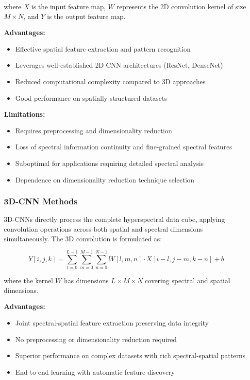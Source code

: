 \documentclass[journal]{IEEEtran}
\begin{document}
where $X$ is the input feature map, $W$ represents the 2D convolution kernel of size $M \times N$, and $Y$ is the output feature map.

\textbf{Advantages:}
\begin{itemize}
\item Effective spatial feature extraction and pattern recognition
\item Leverages well-established 2D CNN architectures (ResNet, DenseNet)
\item Reduced computational complexity compared to 3D approaches
\item Good performance on spatially structured datasets
\end{itemize}

\textbf{Limitations:}
\begin{itemize}
\item Requires preprocessing and dimensionality reduction
\item Loss of spectral information continuity and fine-grained spectral features
\item Suboptimal for applications requiring detailed spectral analysis
\item Dependence on dimensionality reduction technique selection
\end{itemize}

\subsubsection{3D-CNN Methods}

3D-CNNs directly process the complete hyperspectral data cube, applying convolution operations across both spatial and spectral dimensions simultaneously. The 3D convolution is formulated as:

\begin{equation}
Y[i,j,k] = \sum_{l=0}^{L-1} \sum_{m=0}^{M-1} \sum_{n=0}^{N-1} W[l,m,n] \cdot X[i-l, j-m, k-n] + b
\end{equation}

where the kernel $W$ has dimensions $L \times M \times N$ covering spectral and spatial dimensions.

\textbf{Advantages:}
\begin{itemize}
\item Joint spectral-spatial feature extraction preserving data integrity
\item No preprocessing or dimensionality reduction required
\item Superior performance on complex datasets with rich spectral-spatial patterns
\item End-to-end learning with automatic feature discovery
\end{itemize}
\end{document}
